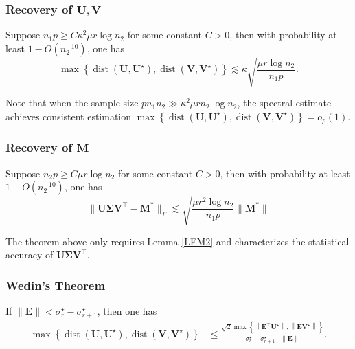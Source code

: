 \documentclass[override]{beamer} %
\theoremstyle{remark}
\newcommand{\bs}[1]{{\boldsymbol{#1}^*}}
\newcommand{\bb}[1]{{\boldsymbol {#1}}}
\begin{document}
\begin{frame}
\frametitle{Recovery of $\boldsymbol {U}, \boldsymbol {V}$}
\begin{theorem}
\label{THM1}
Suppose $n_1 p\geq C \kappa^2 \mu r\log n_2$ for some constant $C>0$, then with probability at least $1-O(n_2^{-10})$, one has
$$
\max \left\{\operatorname{dist}\left(\boldsymbol{U}, \boldsymbol{U}^{\star}\right), \operatorname{dist}\left(\boldsymbol{V}, \boldsymbol{V}^{\star}\right)\right\}  
\lesssim
 \kappa \sqrt{\frac{\mu r \log n_2}{n_1 p}}.
$$
\end{theorem}
Note that when the sample size $pn_1 n_2 \gg \kappa^2 \mu r n_2 \log n_2$, the spectral estimate achieves consistent estimation $\max \left\{\operatorname{dist}\left(\boldsymbol{U}, \boldsymbol{U}^{\star}\right), \operatorname{dist}\left(\boldsymbol{V}, \boldsymbol{V}^{\star}\right)\right\} = o_p(1)$.

\end{frame}



\begin{frame}
\frametitle{Recovery of $\boldsymbol M$}
\begin{theorem}
\label{THM2}
Suppose $n_2 p\geq C\mu r\log n_2$ for some constant $C>0$, then with probability at least $1-O(n_2^{-10})$, one has 
\[
\|\bb U\bb \Sigma \bb V^{\top} 
- \bs M\|_F 
\lesssim
\sqrt{\frac{\mu r^2\log n_2}{n_1 p }} \|\bs M\|
\]
\end{theorem}
The theorem above only requires Lemma \ref{LEM2} and characterizes the statistical accuracy of $\bb U\bb \Sigma \bb V^\top$.

\end{frame}



\begin{frame}
\frametitle{Wedin's Theorem}
\begin{theorem}
If $\|\boldsymbol{E}\|<\sigma_r^{\star}-\sigma_{r+1}^{\star}$, then one has
$$
\begin{aligned}
\max \left\{\operatorname{dist}\left(\boldsymbol{U}, \boldsymbol{U}^{\star}\right), \operatorname{dist}\left(\boldsymbol{V}, \boldsymbol{V}^{\star}\right)\right\} & \leq \frac{\sqrt{2} \max \left\{\left\|\boldsymbol{E}^{\top} \boldsymbol{U}^{\star}\right\|,\left\|\boldsymbol{E} \boldsymbol{V}^{\star}\right\|\right\}}{\sigma_r^{\star}-\sigma_{r+1}^{\star}-\|\boldsymbol{E}\|}.
\end{aligned}
$$
\end{theorem}
\end{frame}
\end{document}
